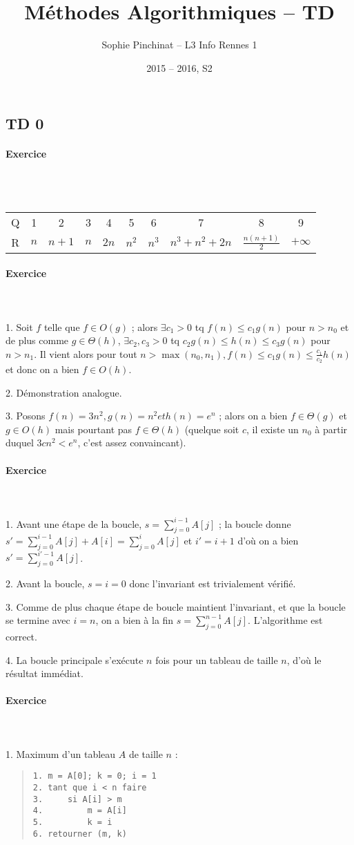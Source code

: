 \documentclass[a4paper]{article}
\title{Méthodes Algorithmiques -- TD}
\author{Sophie Pinchinat -- L3 Info Rennes 1}
\date{2015 -- 2016, S2}
\newcounter{noexo}
\newcommand{\exo}{\stepcounter{noexo} \paragraph{Exercice \thenoexo} ~\\ ~\\}
\begin{document}
\maketitle

\subsection*{TD 0}

\exo
\begin{tabular}{c|ccccccccc}
	Q & 1 & 2 & 3 & 4 & 5 & 6 & 7 & 8 & 9 \\
	R & $n$ & $n+1$ & $n$ & $2n$ & $n^2$ & $n^3$ & $n^3+n^2+2n$ & $\frac{n(n+1)}{2}$ & $+\infty$
\end{tabular}

\exo
1. Soit $f$ telle que $f\in O(g)$ ; alors $\exists c_1>0$ tq $f(n) \leqslant c_1g(n)$ pour $n>n_0$ et de plus comme $g \in \Theta(h)$, $\exists c_2, c_3>0$ tq $c_2g(n) \leqslant h(n) \leqslant c_3g(n)$ pour $n>n_1$. Il vient alors pour tout $n>\max(n_0, n_1), f(n)\leqslant c_1g(n) \leqslant \frac{c_1}{c_2}h(n)$ et donc on a bien $f\in O(h)$.

2. Démonstration analogue.

3. Posons $f(n)=3n^2, g(n)=n^2 et h(n)=e^n$ ; alors on a bien $f\in\Theta(g)$ et $g\in O(h)$ mais pourtant pas $f\in\Theta(h)$ (quelque soit $c$, il existe un $n_0$ à partir duquel $3cn^2 < e^n$, c'est assez convaincant).

\exo
1. Avant une étape de la boucle, $s=\sum_{j=0}^{i-1}A[j]$ ; la boucle donne $s'=\sum_{j=0}^{i-1}A[j] + A[i] = \sum_{j=0}^{i}A[j]$ et $i'=i+1$ d'où on a bien $s'=\sum_{j=0}^{i'-1}A[j]$.

2. Avant la boucle, $s=i=0$ donc l'invariant est trivialement vérifié.

3. Comme de plus chaque étape de boucle maintient l'invariant, et que la boucle se termine avec $i=n$, on a bien à la fin $s=\sum_{j=0}^{n-1}A[j]$. L'algorithme est correct.

4. La boucle principale s'exécute $n$ fois pour un tableau de taille $n$, d'où le résultat immédiat.

\exo
1. Maximum d'un tableau $A$ de taille $n$ :
\begin{quote}\begin{verbatim}
1. m = A[0]; k = 0; i = 1
2. tant que i < n faire
3.     si A[i] > m
4.         m = A[i]
5.         k = i
6. retourner (m, k)
\end{verbatim}\end{quote}
\end{document}
